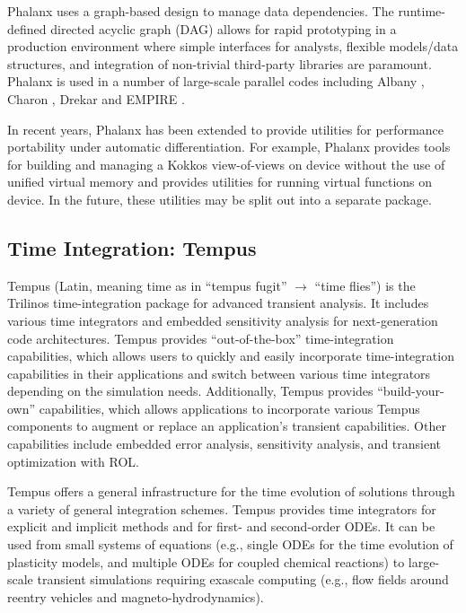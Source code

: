 Phalanx uses a graph-based design to manage data dependencies. The runtime-defined directed acyclic graph (DAG) allows for rapid prototyping in a production environment where simple interfaces for analysts, flexible models/data structures, and integration of non-trivial third-party libraries are paramount. Phalanx is used in a number of large-scale parallel codes including Albany \cite{Salinger2016}, Charon \cite{CharonUsersManual2020}, Drekar \cite{Crockatt2022,Miller2019,Shadid2016mhd} and EMPIRE \cite{BettencourtBrownEtAl2021_EmpirePic}.

In recent years, Phalanx has been extended to provide utilities for performance portability under automatic differentiation. For example, Phalanx provides tools for building and managing a Kokkos view-of-views on device without the use of unified virtual memory and provides utilities for running virtual functions on device. In the future, these utilities may be split out into a separate package.

\subsection{Time Integration: Tempus}
Tempus (Latin, meaning time as in ``tempus fugit'' $\rightarrow$ ``time flies'') is the Trilinos time-integration package for advanced transient
analysis.  It includes various time integrators and embedded
sensitivity analysis for next-generation code architectures.  Tempus
provides ``out-of-the-box'' time-integration capabilities, which
allows users to quickly and easily incorporate time-integration
capabilities in their applications and switch between various time
integrators depending on the simulation needs.  Additionally, Tempus
provides ``build-your-own'' capabilities, which allows applications
to incorporate various Tempus components to augment or replace
an application's transient capabilities. Other capabilities include
embedded error analysis, sensitivity analysis, and transient optimization
with ROL.

Tempus offers a general infrastructure for the time evolution of
solutions through a variety of general integration schemes.  Tempus
provides time integrators for explicit and implicit methods and for
first- and second-order ODEs.  It can be used from small systems of
equations (e.g., single ODEs for the time evolution of plasticity
models, and multiple ODEs for coupled chemical reactions) to
large-scale transient simulations requiring exascale computing
(e.g., flow fields around reentry vehicles and magneto-hydrodynamics).

